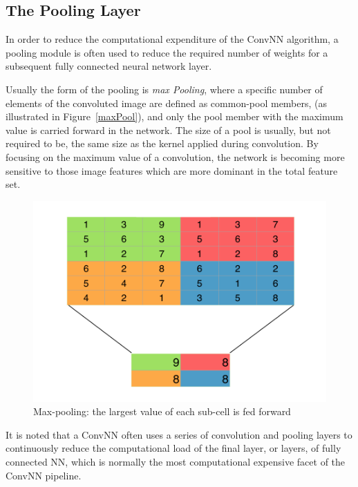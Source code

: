 \documentclass[letterpaper,12pt]{article}
\newcommand{\figref}[1]{Figure~\ref{#1}}
\begin{document}
\subsection{The Pooling Layer}

In order to reduce the computational expenditure of the ConvNN algorithm, a pooling module is often used to reduce the required number of weights for a subsequent fully connected neural network layer.  

Usually the form of the pooling is \textit{max Pooling}, where  a specific number of elements of the convoluted image are defined as common-pool members, (as illustrated in \figref{maxPool}), and only the pool member with the maximum value is carried forward in the network. The size of a pool is usually, but not required to be, the same size as the kernel applied during convolution. By focusing on the maximum value of a convolution, the network is becoming more sensitive to those image features which are more dominant in the total feature set.

\begin{figure}[htbp]
\begin{center}
\includegraphics[scale=0.5]{images/maxpool.png}
\caption{Max-pooling: the largest value of each sub-cell is fed forward}
\label{conv}
\end{center}
\end{figure}

It is noted that a ConvNN often uses a series of convolution and pooling layers to continuously reduce the computational load of the final layer, or layers, of fully connected NN, which is normally the most computational expensive facet of the ConvNN pipeline. 
\end{document}
